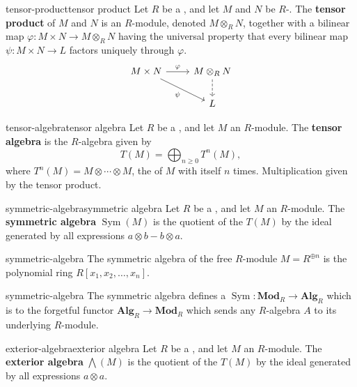 \begin{topic}{tensor-product}{tensor product}
    Let $R$ be a , and let $M$ and $N$ be $R$-. The \textbf{tensor product} of $M$ and $N$ is an $R$-module, denoted $M \otimes_R N$, together with a bilinear map $\varphi : M \times N \to M \otimes_R N$ having the universal property that every bilinear map $\psi : M \times N \to L$ factors uniquely through $\varphi$.
    \[ \begin{tikzcd} M \times N \arrow{r}{\varphi} \arrow[swap]{dr}{\psi} & M \otimes_R N \arrow[dashed]{d} \\ & L \end{tikzcd} \]
\end{topic}

\begin{topic}{tensor-algebra}{tensor algebra}
    Let $R$ be a , and let $M$ an $R$-module. The \textbf{tensor algebra} is the $R$-algebra given by
    \[ T(M) = \bigoplus_{n \ge 0} T^n(M) , \]
    where $T^n(M) = M \otimes \cdots \otimes M$, the  of $M$ with itself $n$ times. Multiplication given by the tensor product.
\end{topic}

\begin{topic}{symmetric-algebra}{symmetric algebra}
    Let $R$ be a , and let $M$ an $R$-module. The \textbf{symmetric algebra} $\operatorname{Sym}(M)$ is the quotient of the  $T(M)$ by the ideal generated by all expressions $a \otimes b - b \otimes a$.
\end{topic}

\begin{example}{symmetric-algebra}
    The symmetric algebra of the free $R$-module $M = R^{\oplus n}$ is the polynomial ring $R[x_1, x_2, \ldots, x_n]$.
\end{example}

\begin{example}{symmetric-algebra}
    The symmetric algebra defines a  $\operatorname{Sym} : \textbf{Mod}_R \to \textbf{Alg}_R$ which is  to the forgetful functor $\textbf{Alg}_R \to \textbf{Mod}_R$ which sends any $R$-algebra $A$ to its underlying $R$-module.
\end{example}

\begin{topic}{exterior-algebra}{exterior algebra}
    Let $R$ be a , and let $M$ an $R$-module. The \textbf{exterior algebra} $\bigwedge(M)$ is the quotient of the  $T(M)$ by the ideal generated by all expressions $a \otimes a$.
\end{topic}
